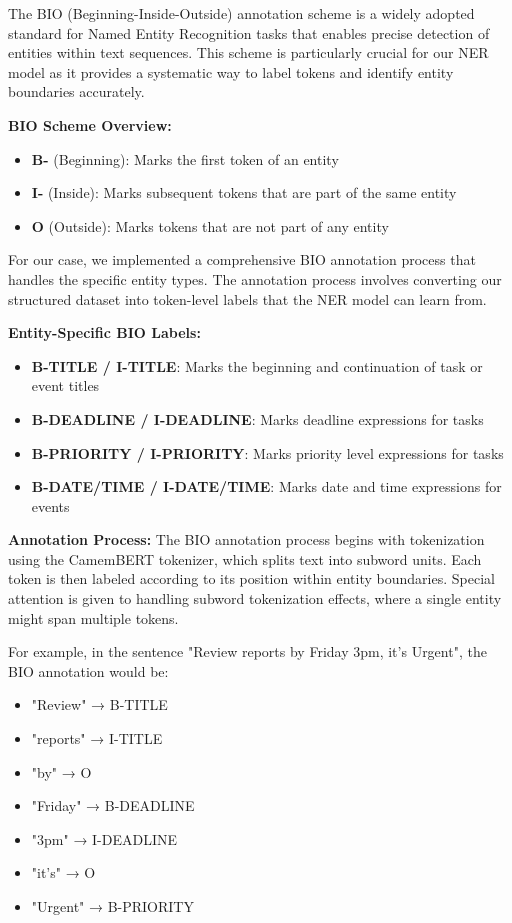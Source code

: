\documentclass[12pt,a4paper]{article}
\begin{document}
The BIO (Beginning-Inside-Outside) annotation scheme is a widely adopted standard for Named Entity Recognition tasks that enables precise detection of entities within text sequences. This scheme is particularly crucial for our NER model as it provides a systematic way to label tokens and identify entity boundaries accurately.

\textbf{BIO Scheme Overview:}
\begin{itemize}
    \item \textbf{B-} (Beginning): Marks the first token of an entity
    \item \textbf{I-} (Inside): Marks subsequent tokens that are part of the same entity
    \item \textbf{O} (Outside): Marks tokens that are not part of any entity
\end{itemize}

For our case, we implemented a comprehensive BIO annotation process that handles the specific entity types. The annotation process involves converting our structured dataset into token-level labels that the NER model can learn from.

\textbf{Entity-Specific BIO Labels:}
\begin{itemize}
    \item \textbf{B-TITLE / I-TITLE}: Marks the beginning and continuation of task or event titles
    \item \textbf{B-DEADLINE / I-DEADLINE}: Marks deadline expressions for tasks
    \item \textbf{B-PRIORITY / I-PRIORITY}: Marks priority level expressions for tasks
    \item \textbf{B-DATE/TIME / I-DATE/TIME}: Marks date and time expressions for events
\end{itemize}

\textbf{Annotation Process:}
The BIO annotation process begins with tokenization using the CamemBERT tokenizer, which splits text into subword units. Each token is then labeled according to its position within entity boundaries. Special attention is given to handling subword tokenization effects, where a single entity might span multiple tokens.

For example, in the sentence "Review reports by Friday 3pm, it's Urgent", the BIO annotation would be:
\begin{itemize}
    \item "Review" → B-TITLE
    \item "reports" → I-TITLE
    \item "by" → O
    \item "Friday" → B-DEADLINE
    \item "3pm" → I-DEADLINE
    \item "it's" → O
    \item "Urgent" → B-PRIORITY
\end{itemize}
\end{document}
